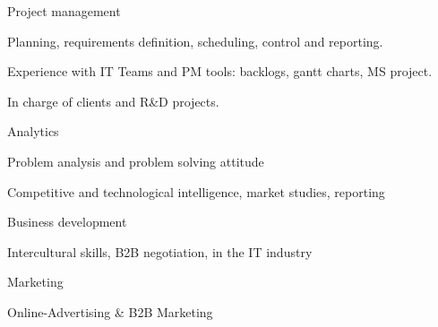 


\begin{cventries}
	
	\zcventry
	{Project management} %
	{
		\begin{cvitems} %
			\item {Planning, requirements definition, scheduling, control and reporting.}
			\item {Experience with IT Teams and PM tools: backlogs, gantt charts, MS project.}
			\item {In charge of clients and R\&D projects.}
		\end{cvitems}
	}
	
	\zcventry
	{Analytics} %
	{
		\begin{cvitems} %
			\item {Problem analysis and problem solving attitude}
			\item {Competitive and technological intelligence, market studies, reporting}
		\end{cvitems}
	}
	
	\zcventry
	{Business development} %
	{
		\begin{cvitems} %
			\item {Intercultural skills, B2B negotiation, in the IT industry}
		\end{cvitems}
	}
	
	\zcventry
	{Marketing} %
	{
		\begin{cvitems} %
			\item {Online-Advertising \& B2B Marketing}
		\end{cvitems}
	}
	
\end{cventries}


